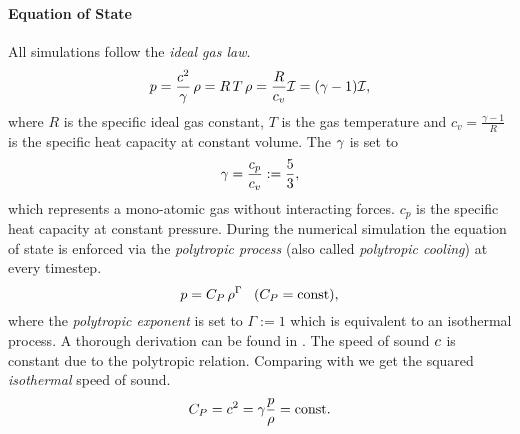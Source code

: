 
\paragraph{Equation of State}
All simulations follow the \emph{ideal gas law}.
\begin{equation}
\label{eqn:ideal-gas-law}
p = \frac{c^2}{\gamma} \, \rho = R\,T\,\rho = \frac{R}{c_v} \mathcal{I} = (\gamma - 1) \mathcal{I},
\end{equation}
where $R$ is the specific ideal gas constant, $T$ is the gas temperature and $c_v
= \frac{\gamma - 1}{R}$ is the specific heat capacity at constant volume. 
The  $\gamma$ is set to
\begin{equation}
\label{eqn:adiabconst}
    \gamma = \frac{c_p}{c_v} := \frac{5}{3},
\end{equation}
which represents a mono-atomic gas without interacting forces. $c_p$ is the
specific heat capacity at constant pressure.  During the numerical simulation
the equation of state is enforced via the \emph{polytropic process} (also
called \emph{polytropic cooling}) at
every timestep.
\begin{equation}
\label{eqn:polytropic-relation}
p = C_P \, \rho^\Gamma \;\;\;(C_P = \text{const}),
\end{equation}
where the \emph{polytropic exponent} is set to $\Gamma := 1$ which is
equivalent to an isothermal process. A thorough derivation can be found in
\cite[p. 2 ff.]{horedt2004polytropes}. 
The speed of sound $c$ is constant due to the polytropic
relation. Comparing  with  we get
the squared \emph{isothermal} speed of sound.
\begin{equation}
    C_P = c^2 = \gamma \frac{p}{\rho} = \text{const.}
\end{equation}


